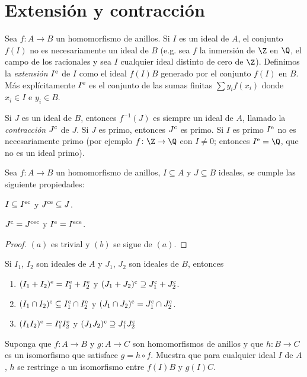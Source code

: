\section{Extensión y contracción}

Sea $f\colon A \to B$ un homomorfismo de anillos. Si $I$ es un ideal de $A$, el conjunto $f(I)$  no es necesariamente un ideal de $B$ (e.g. sea $f$ la inmersión de $\Z$ en $\Q$, el campo de los racionales y sea $I$ cualquier ideal distinto de cero de $\Z$). Definimos la \emph{extensión} $I^{\mathrm{e}}$ de $I$ como el ideal $f(I)B$ generado por el conjunto $f(I)$ en $B$. Más explícitamente $I^{\mathrm{e}}$ es el conjunto de las sumas finitas $\sum y_i f(x_i)$ donde $x_i \in I$ e $y_i \in B$.

Si $J$ es un ideal de $B$, entonces $f^{-1}(J)$ es siempre un ideal de $A$, llamado la \emph{contracción}  $J^{\mathrm{c}}$ de $J$. Si $J$ es primo, entonces $J^{\mathrm{c}}$ es primo. Si $I$ es primo $I^{\mathrm{e}}$ no es necesariamente primo (por ejemplo $f\colon \Z \to \Q$ con $I\neq 0$; entonces $I^\ext = \Q$, que no es un ideal primo).

\begin{proposition}
  Sea $f\colon A \to B$ un homomorfismo de anillos, $I\subseteq A$ y $J\subseteq B$ ideales, se cumple las siguiente propiedades:
  \begin{subtheorem}
    \item $I \subseteq I^{\mathrm{e}\mathrm{c}}$ y $J^{\mathrm{c}\mathrm{e}} \subseteq J$.
    \item $J^{\mathrm{c}} = J^{\mathrm{c}\mathrm{e}\mathrm{c}}$ y $I^{\mathrm{e}} = I^{\mathrm{e}\mathrm{c}\mathrm{e}}$.
  \end{subtheorem}
\end{proposition}
\begin{proof}
  $(a)$ es trivial y $(b)$ se sigue de $(a)$.
\end{proof}




\ExerciseSection

\begin{ExerciseList}
  \item Si $I_1$, $I_2$ son ideales de $A$ y $J_1$, $J_2$ son ideales de $B$, entonces
    \begin{enumerate}
      \item $(I_1+I_2)^{\mathrm{e}} = I_1^{\mathrm{e}} + I_2^{\mathrm{e}}$ y $(J_1+J_2)^{\mathrm{c}} \supseteq J_1^{\mathrm{c}} + J_2^{\mathrm{c}}$.
      \item $(I_1 \cap I_2)^{\mathrm{e}} \subseteq I_1^{\mathrm{e}} \cap I_2^{\mathrm{e}}$ y $(J_1 \cap J_2)^{\mathrm{c}} = J_1^{\mathrm{c}} \cap J_2^{\mathrm{c}}$.
      \item $(I_1 I_2)^{\mathrm{e}} = I_1^{\mathrm{e}} I_2^{\mathrm{e}}$ y $(J_1 J_2)^{\mathrm{c}} \supseteq J_1^{\mathrm{c}} J_2^{\mathrm{c}}$
    \end{enumerate}

  \item Suponga que $f\colon A \to B $ y $g\colon A \to C$ son homomorfismos de anillos y que $h\colon B \to C$ es un isomorfismo que satisface $g = h \circ f$. Muestra que para cualquier ideal $I$ de $A$, $h$ se restringe a un isomorfismo entre $f(I)B$ y $g(I)C$.
\end{ExerciseList}